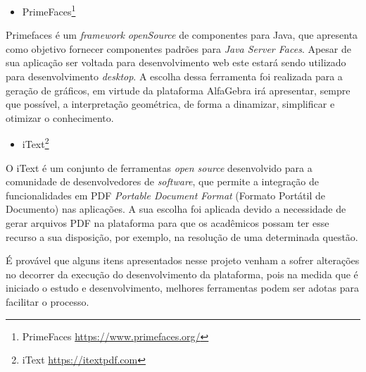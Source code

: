 \begin{itemize}
    \item PrimeFaces\footnote[13]{PrimeFaces \url{https://www.primefaces.org/}}
\end{itemize}
Primefaces é um \textit{framework} \textit{openSource} de componentes para Java, que apresenta como objetivo fornecer componentes padrões para \textit{Java Server Faces}. Apesar de sua aplicação ser voltada para desenvolvimento web este estará sendo utilizado para desenvolvimento \textit{desktop}. A escolha dessa ferramenta foi realizada para a geração de gráficos, em virtude da plataforma AlfaGebra irá apresentar, sempre que possível, a interpretação geométrica, de forma a dinamizar, simplificar e otimizar o conhecimento.

\begin{itemize}
    \item iText\footnote[14]{iText \url{https://itextpdf.com}}
\end{itemize}
O iText é um conjunto de ferramentas \textit{open source} desenvolvido para a comunidade de desenvolvedores de \textit{software}, que permite a integração de funcionalidades em PDF \textit{Portable Document Format} (Formato Portátil de Documento) nas aplicações. A sua escolha foi aplicada devido a necessidade de gerar arquivos PDF na plataforma para que os acadêmicos possam ter esse recurso a sua disposição, por exemplo, na resolução de uma determinada questão.

É provável que alguns itens apresentados nesse projeto venham a sofrer alterações no decorrer da execução do desenvolvimento da plataforma, pois na medida que é iniciado o estudo e desenvolvimento, melhores ferramentas podem ser adotas para facilitar o processo.